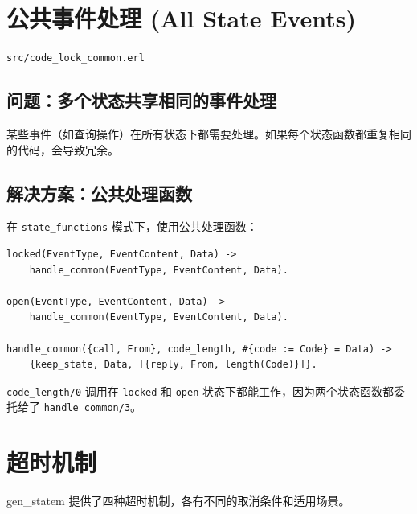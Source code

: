 \documentclass[a4paper,11pt]{article}
\begin{document}
\section{公共事件处理 (All State Events)}

\begin{notebox}[源码文件]
\texttt{src/code\_lock\_common.erl}
\end{notebox}

\subsection{问题：多个状态共享相同的事件处理}

某些事件（如查询操作）在所有状态下都需要处理。如果每个状态函数都重复相同的代码，会导致冗余。

\subsection{解决方案：公共处理函数}

在 \texttt{state\_functions} 模式下，使用公共处理函数：

\begin{lstlisting}[style=erlangstyle]
locked(EventType, EventContent, Data) ->
    handle_common(EventType, EventContent, Data).

open(EventType, EventContent, Data) ->
    handle_common(EventType, EventContent, Data).

handle_common({call, From}, code_length, #{code := Code} = Data) ->
    {keep_state, Data, [{reply, From, length(Code)}]}.
\end{lstlisting}

\begin{tipbox}[关键点]
\texttt{code\_length/0} 调用在 \texttt{locked} 和 \texttt{open} 状态下都能工作，因为两个状态函数都委托给了 \texttt{handle\_common/3}。
\end{tipbox}


\section{超时机制}

gen\_statem 提供了四种超时机制，各有不同的取消条件和适用场景。
\end{document}
